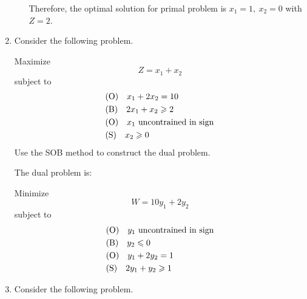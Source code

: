 \documentclass[a4paper]{article}
\begin{document}
\begin{enumerate}
\begin{enumerate}
\begin{solution}
		Therefore, the optimal solution for primal problem is $x_1=1,\ x_2=0$ with $Z=2$.
	\end{solution}
	
\end{enumerate}

\item Consider the following problem.

Maximize $$Z=x_1+x_2$$
subject to
\begin{equation*}
\begin{aligned}
&(\text{O})\quad x_1+2x_2= 10\\
&(\text{B})\quad 2x_1+x_2\geqslant 2\\
&(\text{O})\quad x_1 \text{ uncontrained in sign}\\
&(\text{S})\quad x_2\geqslant 0\\
\end{aligned}
\end{equation*}
Use the SOB method to construct the dual problem.
\begin{solution}
	
	The dual problem is:
	
	Minimize $$W=10y_1+2y_2$$
	subject to
	\begin{equation*}
	\begin{aligned}
	&(\text{O})\quad y_1\text{ uncontrained in sign}\\
	&(\text{B})\quad y_2\leqslant 0\\
	&(\text{O})\quad y_1+2y_2=1\\
	&(\text{S})\quad 2y_1+y_2\geqslant 1\\
	\end{aligned}
	\end{equation*}
	
\end{solution}

\item Consider the following problem.


\end{enumerate}
\end{document}
